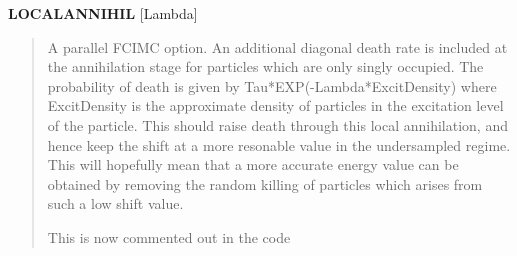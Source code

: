 \documentclass[openany,a4paper,10pt]{manual}
\begin{document}
\textbf{LOCALANNIHIL} {[}Lambda{]}
\begin{quote}

A parallel FCIMC option. An additional diagonal death rate is included at the annihilation
stage for particles which are only singly occupied. The probability of death is given by
Tau*EXP(-Lambda*ExcitDensity) where ExcitDensity is the approximate density of particles in
the excitation level of the particle. This should raise death through this local annihilation,
and hence keep the shift at a more resonable value in the undersampled regime. This will
hopefully mean that a more accurate energy value can be obtained by removing the random
killing of particles which arises from such a low shift value.

This is now commented out in the code
\end{quote}
\end{document}
